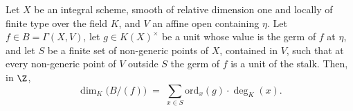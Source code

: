 \begin{theorem}
  \label{thm:finrank_quotient_span_section}
  \leanok
  Let \(X\) be an integral scheme, smooth of relative dimension one and locally of
  finite type over the field \(K\), and \(V\) an affine open containing \(\eta\). Let
  \(f \in B = \Gamma(X, V)\), let \(g \in K(X)^\times\) be a unit whose value is the
  germ of \(f\) at \(\eta\), and let \(S\) be a finite set of non-generic points of
  \(X\), contained in \(V\), such that at every non-generic point of \(V\) outside
  \(S\) the germ of \(f\) is a unit of the stalk. Then, in \(\Z\),
  \[
    \dim_K\bigl(B/(f)\bigr) \;=\;
      \sum_{x \in S} \mathrm{ord}_x(g) \cdot \deg_K(x) .
  \]
\end{theorem}
